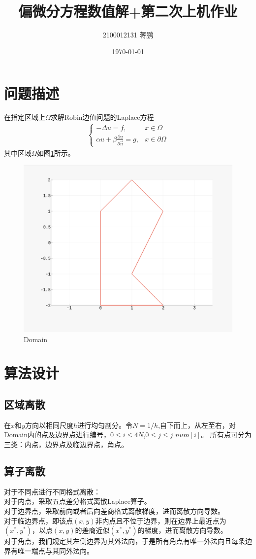 \documentclass[11pt,a4 paper,one side]{article}
\title{偏微分方程数值解+第二次上机作业}
\author{2100012131 蒋鹏}
\date{\today}
\begin{document}
\maketitle
\tableofcontents
\section{问题描述}
在指定区域上$\Omega$求解Robin边值问题的Laplace方程
\begin{align}
\begin{cases}
    -\Delta u=f, &x\in \Omega \\
    \alpha  u+\beta  \frac{\partial u}{\partial \vec{n}}=g, &x\in \partial \Omega
\end{cases}
\end{align}
其中区域$\Omega$如图\ref{Domain}所示。\begin{figure}
    \centering
    \includegraphics[width=0.9\linewidth]{Domain.png}
    \caption{Domain}
    \label{Domain}
\end{figure}
\section{算法设计}
\subsection{区域离散}
在$x$和$y$方向以相同尺度$h$进行均匀剖分。令$N=1/h$,自下而上，从左至右，对Domain内的点及边界点进行编号，$0\leq i \leq 4N$,$0\leq j \leq j\_num[i]$。
所有点可分为三类：内点，边界点及临边界点，角点。
\subsection{算子离散}
对于不同点进行不同格式离散：
\\ 对于内点，采取五点差分格式离散Laplace算子。
\\ 对于边界点，采取前向或者后向差商格式离散梯度，进而离散方向导数。
\\ 对于临边界点，即该点$(x,y)$非内点且不位于边界，则在边界上最近点为$(x^*,y^*)$，以点$(x,y)$的差商近似$(x^*,y^*)$的梯度，进而离散方向导数。
\\ 对于角点，我们规定其左侧边界为其外法向，于是所有角点有唯一外法向且每条边界有唯一端点与其同外法向。
\end{document}
